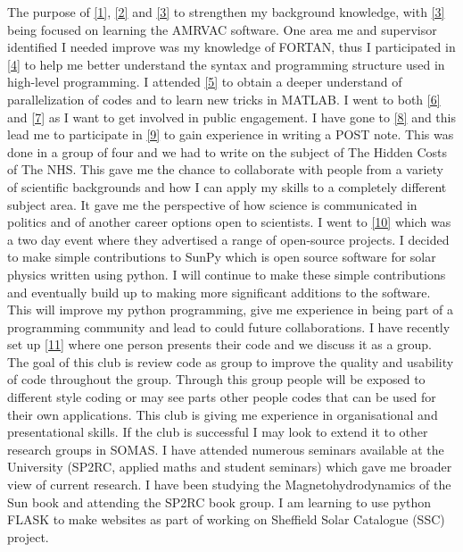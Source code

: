 \documentclass[12pt,a4paper,twoside]{article}
\begin{document}
The purpose of \eqref{1}, \eqref{2} and \eqref{3} to strengthen my background knowledge, with \eqref{3} being focused on learning the AMRVAC software. One area me and supervisor identified I needed improve was my knowledge of FORTAN, thus I participated in \eqref{4} to help me better understand the syntax and programming structure used in high-level programming. I attended \eqref{5} to obtain a deeper understand of parallelization of codes and to learn new tricks in MATLAB. I went to both \eqref{6} and \eqref{7} as I want to get involved in public engagement. I have gone to \eqref{8} and this lead me to participate in \eqref{9} to gain experience in writing a POST note. This was done in a group of four and we had to write on the subject of The Hidden Costs of The NHS. This gave me the chance to collaborate with people from a variety of scientific backgrounds and how I can apply my skills to a completely different subject area. It gave me the perspective of how science is communicated in politics and of another career options open to scientists. I went to \eqref{10} which was a two day event where they advertised a range of open-source projects. I decided to make simple contributions to SunPy which is open source software for solar physics written using python. I will continue to make these simple contributions and eventually build up to making more significant additions to the software. This will improve my python programming, give me experience in being part of a programming community and lead to could future collaborations. I have recently set up \eqref{11} where one person presents their code and we discuss it as a group. The goal of this club is review code as group to improve the quality and usability of code throughout the group. Through this group people will be exposed to different style coding or may see parts other people codes that can be used for their own applications. This club is giving me experience in organisational and presentational skills. If the club is successful I may look to extend it to other research groups in SOMAS. I have attended numerous seminars available at the University (SP2RC, applied maths and student seminars) which gave me broader view of current research. I have been studying the Magnetohydrodynamics of the Sun book and attending the SP2RC book group. I am learning to use python FLASK to make websites as part of working on Sheffield Solar Catalogue (SSC) project.
\end{document}
